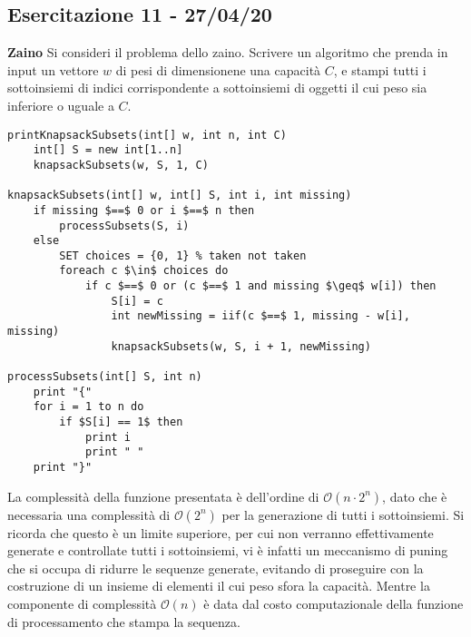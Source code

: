 \documentclass[../cheatSheetAlgoritmi.tex]{subfiles}
\begin{document}
\subsection{Esercitazione 11 - 27/04/20}
\textbf{Zaino}
Si consideri il problema dello zaino. Scrivere un algoritmo che prenda in input un vettore $w$ di pesi di dimensionene una capacità $C$, e stampi tutti i sottoinsiemi di indici corrispondente a sottoinsiemi di oggetti il cui peso sia inferiore o uguale a $C$.
\begin{lstlisting}[caption=Stampa i subsets di Knapsack]
printKnapsackSubsets(int[] w, int n, int C)
    int[] S = new int[1..n]
    knapsackSubsets(w, S, 1, C)

knapsackSubsets(int[] w, int[] S, int i, int missing)
    if missing $==$ 0 or i $==$ n then
        processSubsets(S, i)
    else 
        SET choices = {0, 1} % taken not taken
        foreach c $\in$ choices do
            if c $==$ 0 or (c $==$ 1 and missing $\geq$ w[i]) then
                S[i] = c
                int newMissing = iif(c $==$ 1, missing - w[i], missing)
                knapsackSubsets(w, S, i + 1, newMissing)
                
processSubsets(int[] S, int n) 
    print "{"
    for i = 1 to n do
        if $S[i] == 1$ then
            print i
            print " "
    print "}"
\end{lstlisting}
La complessità della funzione presentata è dell'ordine di $\mathcal{O}(n \cdot 2^n)$, dato che è necessaria una complessità di $\mathcal{O}(2^n)$ per la generazione di tutti i sottoinsiemi. Si ricorda che questo è un limite superiore, per cui non verranno effettivamente generate e controllate tutti i sottoinsiemi, vi è infatti un meccanismo di puning che si occupa di ridurre le sequenze generate, evitando di proseguire con la costruzione di un insieme di elementi il cui peso sfora la capacità. Mentre la componente di complessità $\mathcal{O}(n)$ è data dal costo computazionale della funzione di processamento che stampa la sequenza.
\end{document}
